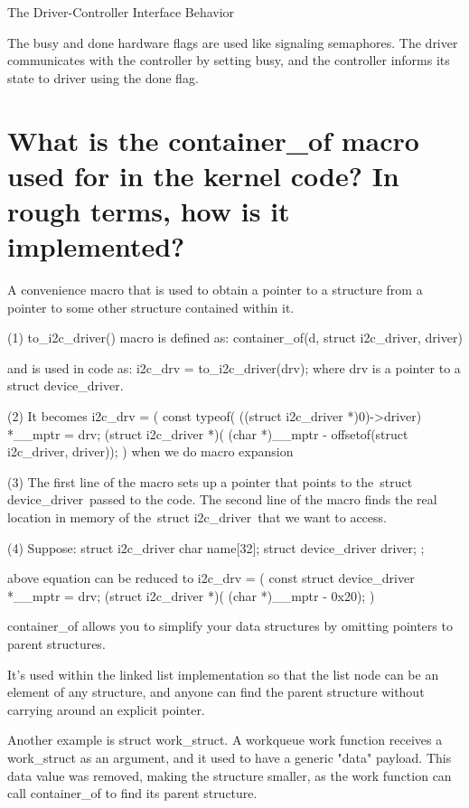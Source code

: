 \documentclass[letterpaper,10pt]{article}
\begin{document}
The Driver-Controller Interface Behavior

The busy and done hardware flags are used like signaling semaphores. The driver communicates with the controller by setting busy, and the controller informs its state to driver using the done flag.

\section{What is the container\_of macro used for in the kernel code? In rough terms, how is it implemented?}

A convenience macro that is used to obtain a pointer to a structure from a pointer to some other structure contained within it. 

(1) to\_i2c\_driver() macro is defined as: 
container\_of(d, struct i2c\_driver, driver)

and is used in code as:
i2c\_drv = to\_i2c\_driver(drv);
where drv is a pointer to a struct device\_driver.

(2) It becomes 
i2c\_drv = ({
        const typeof( ((struct i2c\_driver *)0)->driver) *\_\_mptr = drv;
        (struct i2c\_driver *)( (char *)\_\_mptr - offsetof(struct i2c\_driver, driver));
})
when we do macro expansion

(3) The first line of the macro sets up a pointer that points to the struct device\_driver passed to the code. The second line of the macro finds the real location in memory of the struct i2c\_driver that we want to access.

(4) Suppose: 
struct i2c\_driver {
        char name[32];
        struct device\_driver driver;
};

above equation can be reduced to 
i2c\_drv = ({
        const struct device\_driver *\_\_mptr = drv;
        (struct i2c\_driver *)( (char *)\_\_mptr - 0x20);
})


container\_of allows you to simplify your data structures by omitting pointers to parent structures.

It's used within the linked list implementation so that the list node can be an element of any structure, and anyone can find the parent structure without carrying around an explicit pointer.

Another example is struct work\_struct. A workqueue work function receives a work\_struct as an argument, and it used to have a generic "data" payload. This data value was removed, making the structure smaller, as the work function can call container\_of to find its parent structure.
\end{document}
